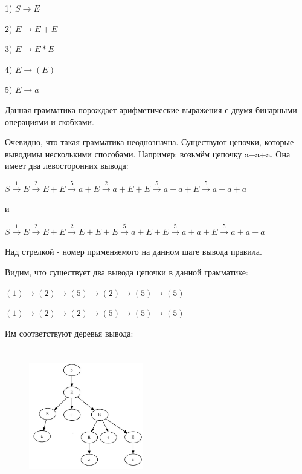\hspace{0,9cm} 1) $S \rightarrow E$
 
\hspace{0,9cm} 2) $E \rightarrow E + E$

\hspace{0,9cm} 3) $E \rightarrow E * E$

\hspace{0,9cm} 4) $E \rightarrow (E)$ 

\hspace{0,9cm} 5) $E \rightarrow a$

Данная грамматика порождает арифметические выражения с двумя бинарными операциями и скобками.

Очевидно, что такая грамматика неоднозначна. Существуют цепочки, которые выводимы несколькими способами. Например: возьмём цепочку a+a+a. Она имеет два левосторонних вывода: 

$S\stackrel{1}{\rightarrow}E\stackrel{2}{\rightarrow}E+E \stackrel{5}{\rightarrow}a+E\stackrel{2}{\rightarrow}a+E+E\stackrel{5}{\rightarrow}a+a+E\stackrel{5}{\rightarrow}a+a+a$

и

$S\stackrel{1}{\rightarrow}E\stackrel{2}{\rightarrow}E+E \stackrel{2}{\rightarrow}E+E+E\stackrel{5}{\rightarrow}a+E+E\stackrel{5}{\rightarrow}a+a+E\stackrel{5}{\rightarrow}a+a+a$

Над стрелкой - номер применяемого на данном шаге вывода правила.

Видим, что существует два вывода цепочки в данной грамматике:

 $(1)\rightarrow(2)\rightarrow(5)\rightarrow(2)\rightarrow(5)\rightarrow(5)$
 
 $(1)\rightarrow(2)\rightarrow(2)\rightarrow(5)\rightarrow(5)\rightarrow(5)$ 
  
 Им соответствуют деревья вывода:
 \clearpage
 
\begin{figure}[h]
	\centering
		\includegraphics[width=5cm,height=6cm]{Pictures/div_tree1.jpeg}
	\label{fig:div_tree1}
\end{figure}

